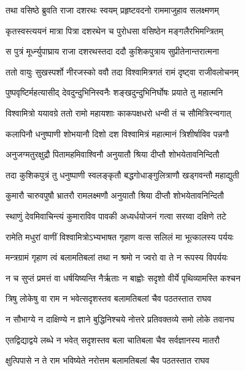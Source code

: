 
\twolineshloka
{तथा वसिष्ठे ब्रुवति राजा दशरथः स्वयम्}
{प्रहृष्टवदनो राममाजुहाव सलक्ष्मणम्} %

\twolineshloka
{कृतस्वस्त्ययनं मात्रा पित्रा दशरथेन च}
{पुरोधसा वसिष्ठेन मङ्गलैरभिमन्त्रितम्} %

\twolineshloka
{स पुत्रं मूर्ध्न्युपाघ्राय राजा दशरथस्तदा}
{ददौ कुशिकपुत्राय सुप्रीतेनान्तरात्मना} %

\twolineshloka
{ततो वायुः सुखस्पर्शो नीरजस्को ववौ तदा}
{विश्वामित्रगतं रामं दृष्ट्वा राजीवलोचनम्} %

\twolineshloka
{पुष्पवृष्टिर्महत्यासीद् देवदुन्दुभिनिस्वनैः}
{शङ्खदुन्दुभिनिर्घोषः प्रयाते तु महात्मनि} %

\twolineshloka
{विश्वामित्रो ययावग्रे ततो रामो महायशाः}
{काकपक्षधरो धन्वी तं च सौमित्रिरन्वगात्} %

\twolineshloka
{कलापिनौ धनुष्पाणी शोभयानौ दिशो दश}
{विश्वामित्रं महात्मानं त्रिशीर्षाविव पन्नगौ} %

\twolineshloka
{अनुजग्मतुरक्षुद्रौ पितामहमिवाश्विनौ}
{अनुयातौ श्रिया दीप्तौ शोभयेतावनिन्दितौ} %

\twolineshloka
{तदा कुशिकपुत्रं तु धनुष्पाणी स्वलङ्कृतौ}
{बद्धगोधाङ्गुलित्राणौ खड्गवन्तौ महाद्युती} %

\twolineshloka
{कुमारौ चारुवपुषौ भ्रातरौ रामलक्ष्मणौ}
{अनुयातौ श्रिया दीप्तौ शोभयेतावनिन्दितौ} %

\twolineshloka
{स्थाणुं देवमिवाचिन्त्यं कुमाराविव पावकी}
{अध्यर्धयोजनं गत्वा सरय्वा दक्षिणे तटे} %

\twolineshloka
{रामेति मधुरां वाणीं विश्वामित्रोऽभ्यभाषत}
{गृहाण वत्स सलिलं मा भूत्कालस्य पर्ययः} %

\twolineshloka
{मन्त्रग्रामं गृहाण त्वं बलामतिबलां तथा}
{न श्रमो न ज्वरो वा ते न रूपस्य विपर्ययः} %

\twolineshloka
{न च सुप्तं प्रमत्तं वा धर्षयिष्यन्ति नैर्ऋताः}
{न बाह्वोः सदृशो वीर्ये पृथिव्यामस्ति कश्चन} %

\twolineshloka
{त्रिषु लोकेषु वा राम न भवेत्सदृशस्तव}
{बलामतिबलां चैव पठतस्तात राघव} %

\twolineshloka
{न सौभाग्ये न दाक्षिण्ये न ज्ञाने बुद्धिनिश्चये}
{नोत्तरे प्रतिवक्तव्ये समो लोके तवानघ} %

\twolineshloka
{एतद्विद्याद्वये लब्धे न भवेत् सदृशस्तव}
{बला चातिबला चैव सर्वज्ञानस्य मातरौ} %

\twolineshloka
{क्षुत्पिपासे न ते राम भविष्येते नरोत्तम}
{बलामतिबलां चैव पठतस्तात राघव} %


